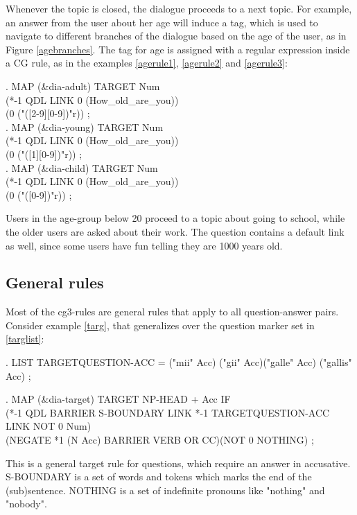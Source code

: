 \documentclass[11pt]{article}
\begin{document}
Whenever the topic is closed, the dialogue proceeds to a next topic. For example, an answer from the user about her age will induce a tag, which is used to navigate to different branches of the dialogue based on the age of the user, as in Figure \ref{agebranches}. The tag for age is assigned with a regular expression inside a CG rule, as in the examples \ref{agerule1}, \ref{agerule2} and \ref{agerule3}: 

\ex.\flushleft\label{agerule1}  \small{MAP (\&dia-adult) TARGET Num \\(*-1 QDL LINK 0 (How\_old\_are\_you)) \\ (0 ("([2-9][0-9])"r)) ;} \\

\ex.\flushleft\label{agerule2} \small{MAP (\&dia-young) TARGET Num \\(*-1 QDL LINK 0 (How\_old\_are\_you))\\ (0 ("([1][0-9])"r)) ;} \\

\ex.\flushleft\label{agerule3} \small{MAP (\&dia-child) TARGET Num \\(*-1 QDL LINK 0 (How\_old\_are\_you)) \\(0 ("([0-9])"r)) ;} 

Users in the age-group below 20 proceed to a topic about going to school, while the older users are asked about their work. The question contains a  default link as well, since some users have fun telling they are 1000 years old.

\subsection{General rules} 
Most of the cg3-rules are general rules that apply to all question-answer pairs. Consider example \ref{targ},  that generalizes over the question marker set in \ref{targlist}:

\ex.\flushleft\label{targlist} \small{LIST TARGETQUESTION-ACC = ("mii" Acc) ("gii" Acc)("galle" Acc) ("gallis" Acc) ;}

\ex.\flushleft\label{targ} \small{MAP (\&dia-target) TARGET NP-HEAD + Acc IF \\
(*-1 QDL BARRIER S-BOUNDARY LINK *-1 TARGETQUESTION-ACC LINK NOT 0 Num)\\
(NEGATE *1 (N Acc) BARRIER VERB OR CC)(NOT 0 NOTHING) ;}

This is a general target rule for questions, which require an answer in accusative. S-BOUNDARY is a set of words and tokens which marks the end of the (sub)sentence. NOTHING is a set of indefinite pronouns like "nothing" and "nobody". 
\end{document}
